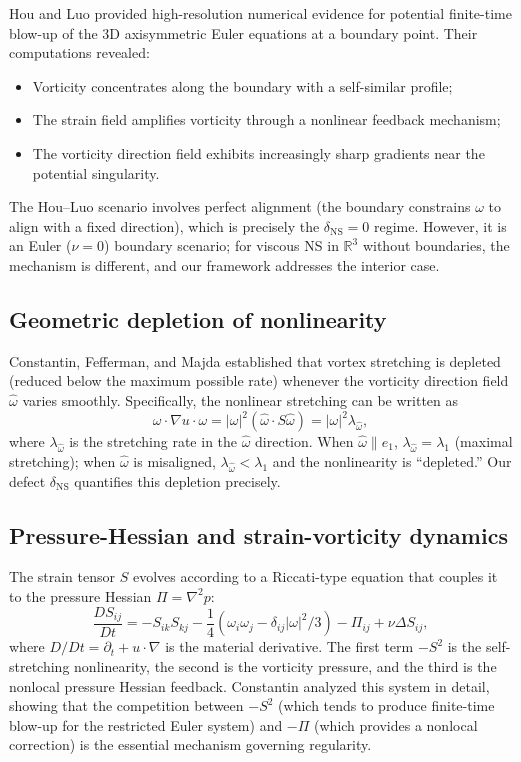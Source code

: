 \documentclass[11pt]{article}
\theoremstyle{definition}
\theoremstyle{remark}
\newcommand{\R}{\mathbb{R}}
\begin{document}
Hou and Luo \cite{HL} provided high-resolution numerical evidence for potential
finite-time blow-up of the 3D axisymmetric Euler equations at a boundary point.
Their computations revealed:
\begin{itemize}[nosep]
  \item Vorticity concentrates along the boundary with a self-similar profile;
  \item The strain field amplifies vorticity through a nonlinear feedback mechanism;
  \item The vorticity direction field exhibits increasingly sharp gradients near the
    potential singularity.
\end{itemize}
The Hou--Luo scenario involves perfect alignment (the boundary constrains $\omega$
to align with a fixed direction), which is precisely the $\delta_{\mathrm{NS}} = 0$
regime.  However, it is an Euler ($\nu = 0$) boundary scenario; for viscous NS in
$\R^3$ without boundaries, the mechanism is different, and our framework addresses
the interior case.

\subsection{Geometric depletion of nonlinearity}

Constantin, Fefferman, and Majda \cite{CF2} established that vortex stretching is
depleted (reduced below the maximum possible rate) whenever the vorticity direction
field $\hat\omega$ varies smoothly.  Specifically, the nonlinear stretching can be
written as
\[
  \omega \cdot \nabla u \cdot \omega = |\omega|^2 (\hat\omega \cdot S\hat\omega)
  = |\omega|^2 \lambda_{\hat\omega},
\]
where $\lambda_{\hat\omega}$ is the stretching rate in the $\hat\omega$ direction.
When $\hat\omega \| e_1$, $\lambda_{\hat\omega} = \lambda_1$ (maximal stretching);
when $\hat\omega$ is misaligned, $\lambda_{\hat\omega} < \lambda_1$ and the
nonlinearity is ``depleted.''  Our defect $\delta_{\mathrm{NS}}$ quantifies this
depletion precisely.

\subsection{Pressure-Hessian and strain-vorticity dynamics}

The strain tensor $S$ evolves according to a Riccati-type equation that couples
it to the pressure Hessian $\Pi = \nabla^2 p$:
\begin{equation}\label{eq:strain-riccati}
  \frac{DS_{ij}}{Dt} = -S_{ik}S_{kj} - \frac{1}{4}(\omega_i\omega_j
  - \delta_{ij}|\omega|^2/3) - \Pi_{ij} + \nu\Delta S_{ij},
\end{equation}
where $D/Dt = \partial_t + u \cdot \nabla$ is the material derivative.  The first
term $-S^2$ is the self-stretching nonlinearity, the second is the vorticity
pressure, and the third is the nonlocal pressure Hessian feedback.  Constantin
\cite{Constantin-PH} analyzed this system in detail, showing that the
competition between $-S^2$ (which tends to produce finite-time blow-up for the
restricted Euler system) and $-\Pi$ (which provides a nonlocal correction) is
the essential mechanism governing regularity.
\end{document}
